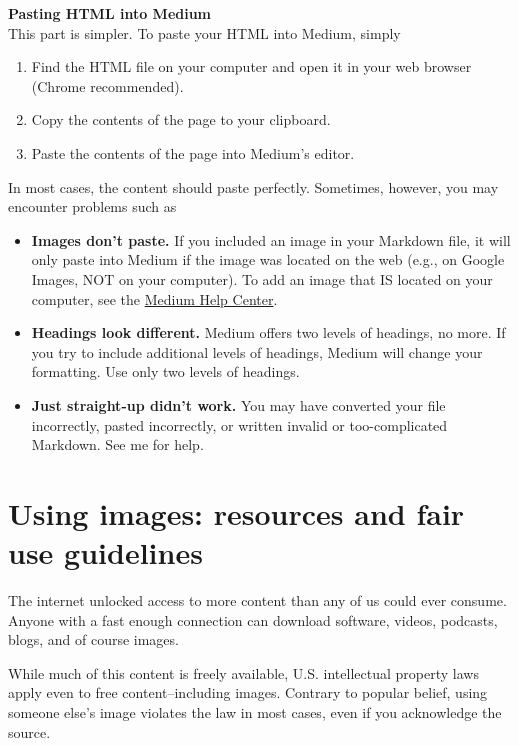 \documentclass[]{book}
\providecommand{\tightlist}{%
  \setlength{\itemsep}{0pt}\setlength{\parskip}{0pt}}
\theoremstyle{definition}
\theoremstyle{definition}
\theoremstyle{definition}
\theoremstyle{remark}
\begin{document}
\textbf{Pasting HTML into Medium}\\
This part is simpler. To paste your HTML into Medium, simply

\begin{enumerate}
\def\labelenumi{\arabic{enumi}.}
\tightlist
\item
  Find the HTML file on your computer and open it in your web browser
  (Chrome recommended).
\item
  Copy the contents of the page to your clipboard.
\item
  Paste the contents of the page into Medium's editor.
\end{enumerate}

In most cases, the content should paste perfectly. Sometimes, however,
you may encounter problems such as

\begin{itemize}
\tightlist
\item
  \textbf{Images don't paste.} If you included an image in your Markdown
  file, it will only paste into Medium if the image was located on the
  web (e.g., on Google Images, NOT on your computer). To add an image
  that IS located on your computer, see the
  \href{https://help.medium.com/hc/en-us/articles/215679797}{Medium Help
  Center}.
\item
  \textbf{Headings look different.} Medium offers two levels of
  headings, no more. If you try to include additional levels of
  headings, Medium will change your formatting. Use only two levels of
  headings.
\item
  \textbf{Just straight-up didn't work.} You may have converted your
  file incorrectly, pasted incorrectly, or written invalid or
  too-complicated Markdown. See me for help.
\end{itemize}

\hypertarget{using-images-resources-and-fair-use-guidelines}{%
\section{Using images: resources and fair use
guidelines}\label{using-images-resources-and-fair-use-guidelines}}

The internet unlocked access to more content than any of us could ever
consume. Anyone with a fast enough connection can download software,
videos, podcasts, blogs, and of course images.

While much of this content is freely available, U.S. intellectual
property laws apply even to free content--including images. Contrary to
popular belief, using someone else's image violates the law in most
cases, even if you acknowledge the source.
\end{document}

